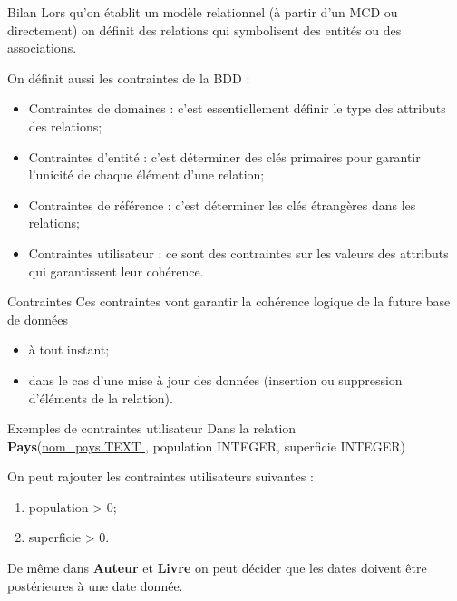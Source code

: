 \documentclass[10pt]{nsibeamer}
\begin{document}
\begin{frame}{Bilan}
	Lors qu'on établit un modèle relationnel (à partir d'un MCD ou directement) on définit des relations qui symbolisent des entités ou des associations.

	On définit aussi les \alert{contraintes} de la BDD :
	\begin{itemize}
		\item	\alert{Contraintes de domaines} : c'est essentiellement définir le type des attributs des relations;
		\item	\alert{Contraintes d'entité} : c'est déterminer des clés primaires pour garantir l'unicité de chaque élément d'une relation;
		\item 	\alert{Contraintes de référence} : c'est déterminer les clés étrangères dans les relations;
		\item 	\alert{Contraintes utilisateur} : ce sont des contraintes sur les valeurs des attributs qui garantissent leur cohérence.
	\end{itemize}
\end{frame}
\begin{frame}{Contraintes}
	Ces contraintes vont garantir la cohérence logique de la future base de données
	\begin{itemize}
		\item	à tout instant;
		\item	dans le cas d'une mise à jour des données (insertion ou suppression d'éléments de la relation).
	\end{itemize}
\end{frame}
\begin{frame}{Exemples de contraintes utilisateur}
	Dans la relation \\

	{\footnotesize
		\textbf{Pays}(\uline{nom\_pays TEXT }, population INTEGER, superficie INTEGER)\\}

	On peut rajouter les contraintes utilisateurs suivantes :
	\begin{enumerate}[--]
		\item 	population > 0;
		\item 	superficie > 0.
	\end{enumerate}
	De même dans \textbf{Auteur} et \textbf{Livre} on peut décider que les dates doivent être postérieures à une date donnée.
\end{frame}
\end{document}
